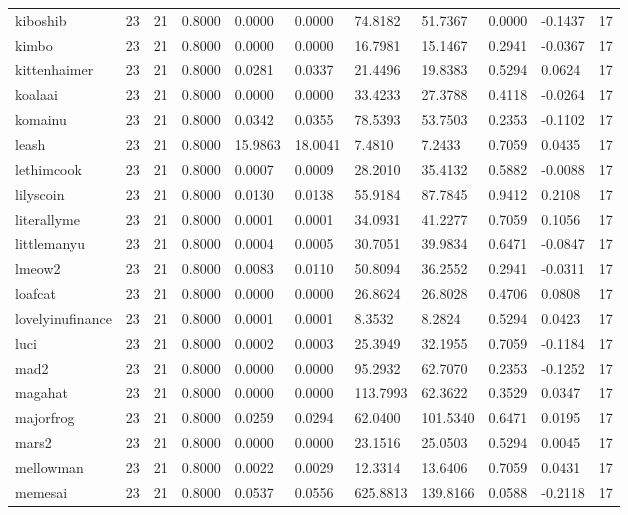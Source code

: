 \begin{table}[htbp]
\begin{tabular}{lllllllllll}
kiboshib & 23 & 21 & 0.8000 & 0.0000 & 0.0000 & 74.8182 & 51.7367 & 0.0000 & -0.1437 & 17 \\
kimbo & 23 & 21 & 0.8000 & 0.0000 & 0.0000 & 16.7981 & 15.1467 & 0.2941 & -0.0367 & 17 \\
kittenhaimer & 23 & 21 & 0.8000 & 0.0281 & 0.0337 & 21.4496 & 19.8383 & 0.5294 & 0.0624 & 17 \\
koalaai & 23 & 21 & 0.8000 & 0.0000 & 0.0000 & 33.4233 & 27.3788 & 0.4118 & -0.0264 & 17 \\
komainu & 23 & 21 & 0.8000 & 0.0342 & 0.0355 & 78.5393 & 53.7503 & 0.2353 & -0.1102 & 17 \\
leash & 23 & 21 & 0.8000 & 15.9863 & 18.0041 & 7.4810 & 7.2433 & 0.7059 & 0.0435 & 17 \\
lethimcook & 23 & 21 & 0.8000 & 0.0007 & 0.0009 & 28.2010 & 35.4132 & 0.5882 & -0.0088 & 17 \\
lilyscoin & 23 & 21 & 0.8000 & 0.0130 & 0.0138 & 55.9184 & 87.7845 & 0.9412 & 0.2108 & 17 \\
literallyme & 23 & 21 & 0.8000 & 0.0001 & 0.0001 & 34.0931 & 41.2277 & 0.7059 & 0.1056 & 17 \\
littlemanyu & 23 & 21 & 0.8000 & 0.0004 & 0.0005 & 30.7051 & 39.9834 & 0.6471 & -0.0847 & 17 \\
lmeow2 & 23 & 21 & 0.8000 & 0.0083 & 0.0110 & 50.8094 & 36.2552 & 0.2941 & -0.0311 & 17 \\
loafcat & 23 & 21 & 0.8000 & 0.0000 & 0.0000 & 26.8624 & 26.8028 & 0.4706 & 0.0808 & 17 \\
lovelyinufinance & 23 & 21 & 0.8000 & 0.0001 & 0.0001 & 8.3532 & 8.2824 & 0.5294 & 0.0423 & 17 \\
luci & 23 & 21 & 0.8000 & 0.0002 & 0.0003 & 25.3949 & 32.1955 & 0.7059 & -0.1184 & 17 \\
mad2 & 23 & 21 & 0.8000 & 0.0000 & 0.0000 & 95.2932 & 62.7070 & 0.2353 & -0.1252 & 17 \\
magahat & 23 & 21 & 0.8000 & 0.0000 & 0.0000 & 113.7993 & 62.3622 & 0.3529 & 0.0347 & 17 \\
majorfrog & 23 & 21 & 0.8000 & 0.0259 & 0.0294 & 62.0400 & 101.5340 & 0.6471 & 0.0195 & 17 \\
mars2 & 23 & 21 & 0.8000 & 0.0000 & 0.0000 & 23.1516 & 25.0503 & 0.5294 & 0.0045 & 17 \\
mellowman & 23 & 21 & 0.8000 & 0.0022 & 0.0029 & 12.3314 & 13.6406 & 0.7059 & 0.0431 & 17 \\
memesai & 23 & 21 & 0.8000 & 0.0537 & 0.0556 & 625.8813 & 139.8166 & 0.0588 & -0.2118 & 17 \\

\end{tabular}
\end{table}

